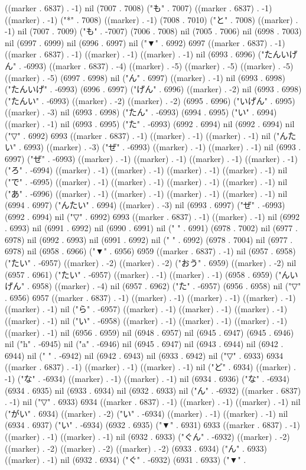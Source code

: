 ((marker . 6837) . -1) nil (7007 . 7008) ("も" . 7007) ((marker . 6837) . -1) ((marker) . -1) ("*" . 7008) ((marker) . -1) (7008 . 7010) ("と" . 7008) ((marker) . -1) nil (7007 . 7009) ("も" . -7007) (7006 . 7008) nil (7005 . 7006) nil (6998 . 7003) nil (6997 . 6999) nil (6996 . 6997) nil ("▼" . 6992) 6997 ((marker . 6837) . -1) ((marker . 6837) . -1) ((marker) . -1) ((marker) . -1) nil (6993 . 6996) ("たんいげん" . -6993) ((marker . 6837) . -4) ((marker) . -5) ((marker) . -5) ((marker) . -5) ((marker) . -5) (6997 . 6998) nil ("ん" . 6997) ((marker) . -1) nil (6993 . 6998) ("たんいげ" . -6993) (6996 . 6997) ("げん" . 6996) ((marker) . -2) nil (6993 . 6998) ("たんい" . -6993) ((marker) . -2) ((marker) . -2) (6995 . 6996) ("いげん" . 6995) ((marker) . -3) nil (6993 . 6998) ("たん" . -6993) (6994 . 6995) ("い" . 6994) ((marker) . -1) nil (6993 . 6995) ("た" . -6993) (6992 . 6994) nil (6992 . 6994) nil ("▽" . 6992) 6993 ((marker . 6837) . -1) ((marker) . -1) ((marker) . -1) nil ("んたい" . 6993) ((marker) . -3) ("ぜ" . -6993) ((marker) . -1) ((marker) . -1) nil (6993 . 6997) ("ぜ" . -6993) ((marker) . -1) ((marker) . -1) ((marker) . -1) ((marker) . -1) ("ろ" . -6994) ((marker) . -1) ((marker) . -1) ((marker) . -1) ((marker) . -1) nil ("で" . -6995) ((marker) . -1) ((marker) . -1) ((marker) . -1) ((marker) . -1) nil ("あ" . -6996) ((marker) . -1) ((marker) . -1) ((marker) . -1) ((marker) . -1) nil (6994 . 6997) ("んたい" . 6994) ((marker) . -3) nil (6993 . 6997) ("ぜ" . -6993) (6992 . 6994) nil ("▽" . 6992) 6993 ((marker . 6837) . -1) ((marker) . -1) nil (6992 . 6993) nil (6991 . 6992) nil (6990 . 6991) nil (" " . 6991) (6978 . 7002) nil (6977 . 6978) nil (6992 . 6993) nil (6991 . 6992) nil (" " . 6992) (6978 . 7004) nil (6977 . 6978) nil (6958 . 6966) ("▼" . 6956) 6959 ((marker . 6837) . -1) nil (6957 . 6958) ("たい" . -6957) ((marker) . -2) ((marker) . -2) ("おう" . 6959) ((marker) . -2) nil (6957 . 6961) ("たい" . -6957) ((marker) . -1) ((marker) . -1) (6958 . 6959) ("んいげん" . 6958) ((marker) . -4) nil (6957 . 6962) ("た" . -6957) (6956 . 6958) nil ("▽" . 6956) 6957 ((marker . 6837) . -1) ((marker) . -1) ((marker) . -1) ((marker) . -1) ((marker) . -1) nil ("ら" . -6957) ((marker) . -1) ((marker) . -1) ((marker) . -1) ((marker) . -1) nil ("い" . -6958) ((marker) . -1) ((marker) . -1) ((marker) . -1) ((marker) . -1) nil (6956 . 6959) nil (6948 . 6957) nil (6945 . 6947) (6945 . 6946) nil ("h" . -6945) nil ("a" . -6946) nil (6945 . 6947) nil (6943 . 6944) nil (6942 . 6944) nil (" " . -6942) nil (6942 . 6943) nil (6933 . 6942) nil ("▽" . 6933) 6934 ((marker . 6837) . -1) ((marker) . -1) ((marker) . -1) nil ("ど" . 6934) ((marker) . -1) ("な" . -6934) ((marker) . -1) ((marker) . -1) nil (6934 . 6936) ("な" . -6934) (6934 . 6935) nil (6933 . 6934) nil (6932 . 6933) nil ("ん" . -6932) ((marker . 6837) . -1) nil ("▽" . 6933) 6934 ((marker . 6837) . -1) ((marker) . -1) ((marker) . -1) nil ("がい" . 6934) ((marker) . -2) ("い" . -6934) ((marker) . -1) ((marker) . -1) nil (6934 . 6937) ("い" . -6934) (6932 . 6935) ("▼" . 6931) 6933 ((marker . 6837) . -1) ((marker) . -1) ((marker) . -1) nil (6932 . 6933) ("ぐん" . -6932) ((marker) . -2) ((marker) . -2) ((marker) . -2) ((marker) . -2) (6933 . 6934) ("ん" . 6933) ((marker) . -1) nil (6932 . 6934) ("ぐ" . -6932) (6931 . 6933) ("▼" . 